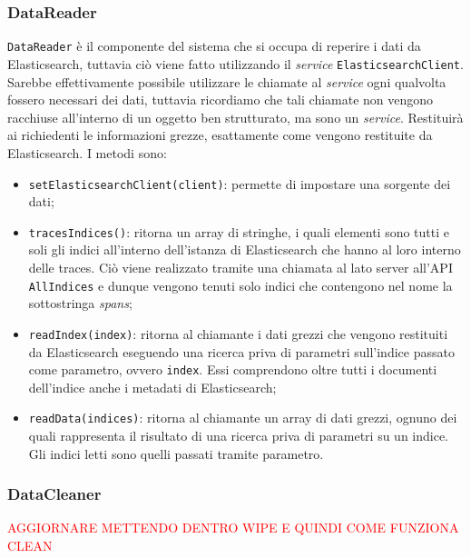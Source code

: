 \subsubsection{DataReader}
\label{sec:DataReader}
\texttt{DataReader} è il componente del sistema che si occupa di reperire i dati da Elasticsearch, tuttavia ciò viene fatto utilizzando il \emph{service} \texttt{ElasticsearchClient}. Sarebbe effettivamente possibile utilizzare le chiamate al \emph{service} ogni qualvolta fossero necessari dei dati, tuttavia ricordiamo che tali chiamate non vengono racchiuse all'interno di un oggetto ben strutturato, ma sono un \emph{service}. Restituirà ai richiedenti le informazioni grezze, esattamente come vengono restituite da Elasticsearch. I metodi sono: 
 

\begin{itemize}
	\item \texttt{setElasticsearchClient(client)}: permette di impostare una sorgente dei dati;
	\item \texttt{tracesIndices()}: ritorna un array di stringhe, i quali elementi sono tutti e soli gli indici all'interno dell'istanza di Elasticsearch che hanno al loro interno delle traces. Ciò viene realizzato tramite una chiamata al lato server all'API \texttt{AllIndices} e dunque vengono tenuti solo indici che contengono nel nome la sottostringa \emph{spans};
	\item \texttt{readIndex(index)}: ritorna al chiamante i dati grezzi che vengono restituiti da Elasticsearch eseguendo una ricerca priva di parametri sull'indice passato come parametro, ovvero \texttt{index}. Essi comprendono oltre tutti i documenti dell'indice anche i metadati di Elasticsearch;
	\item \texttt{readData(indices)}: ritorna al chiamante un array di dati grezzi, ognuno dei quali rappresenta il risultato di una ricerca priva di parametri su un indice. Gli indici letti sono quelli passati tramite parametro.


\end{itemize}



\subsubsection{DataCleaner}

\textcolor{red}{AGGIORNARE METTENDO DENTRO WIPE E QUINDI COME FUNZIONA CLEAN}

